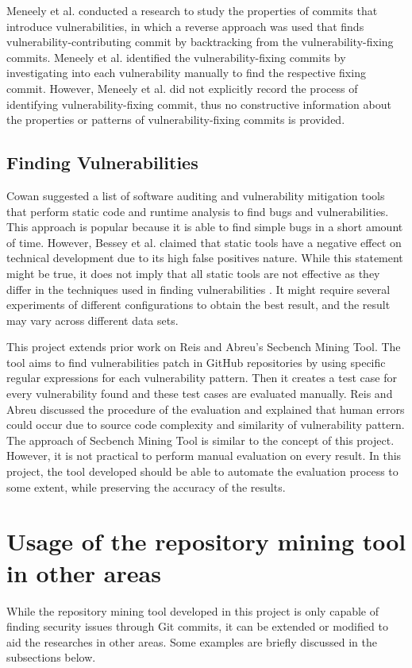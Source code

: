 \documentclass[12pt, a4paper]{report}
\begin{document}
Meneely et al. \cite{meneely_2013} conducted a research to study the properties of commits that
introduce vulnerabilities, in which a reverse approach was used that finds
vulnerability-contributing commit by backtracking from the vulnerability-fixing commits. Meneely et
al. identified the vulnerability-fixing commits by investigating into each vulnerability manually to
find the respective fixing commit. However, Meneely et al. did not explicitly record the process of
identifying vulnerability-fixing commit, thus no constructive information about the properties or
patterns of vulnerability-fixing commits is provided.



\subsection{Finding Vulnerabilities}
Cowan \cite{cowan_2003} suggested a list of software auditing and vulnerability mitigation tools
that perform static code and runtime analysis to find bugs and vulnerabilities. This approach is
popular because it is able to find simple bugs in a short amount of time. However, Bessey et al.
\cite{bessey_2010} claimed that static tools have a negative effect on technical development due to
its high false positives nature. While this statement might be true, it does not imply that all
static tools are not effective as they differ in the techniques used in finding vulnerabilities
\cite{moser_2008}. It might require several experiments of different configurations to obtain the
best result, and the result may vary across different data sets.

This project extends prior work on Reis and Abreu's \cite{secbench} Secbench Mining Tool. The tool
aims to find vulnerabilities patch in GitHub repositories by using specific regular expressions for
each vulnerability pattern. Then it creates a test case for every vulnerability found and these test
cases are evaluated manually. Reis and Abreu \cite{reis_2017} discussed the procedure of the
evaluation and explained that human errors could occur due to source code complexity and similarity
of vulnerability pattern. The approach of Secbench Mining Tool is similar to the concept of this
project. However, it is not practical to perform manual evaluation on every result. In this project,
the tool developed should be able to automate the evaluation process to some extent, while
preserving the accuracy of the results.

\section{Usage of the repository mining tool in other areas}
While the repository mining tool developed in this project is only capable of finding security
issues through Git commits, it can be extended or modified to aid the researches in other areas.
Some examples are briefly discussed in the subsections below.
\end{document}
